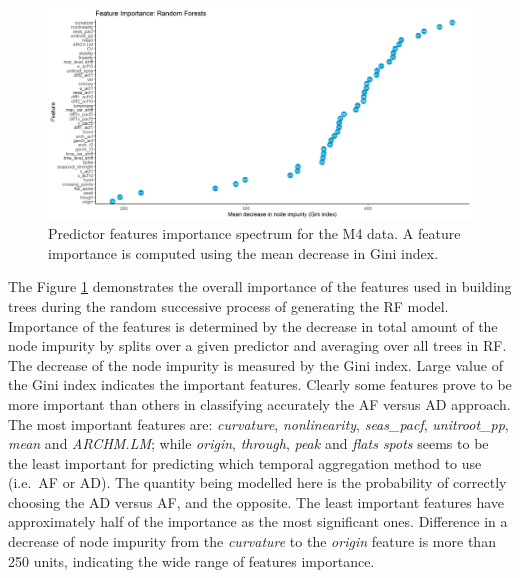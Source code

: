 \documentclass[preprint, 3p,
authoryear]{elsarticle} %
\begin{document}
\begin{figure}[H]

{\centering \includegraphics[width=0.95\linewidth]{img/300dpi/Fig_importance} 

}

\caption{Predictor features importance spectrum for the M4 data. A feature importance is computed using the mean decrease in Gini index.}\label{fig:RFpartial}
\end{figure}

The Figure \ref{fig:RFpartial} demonstrates the overall importance of
the features used in building trees during the random successive process
of generating the RF model. Importance of the features is determined by
the decrease in total amount of the node impurity by splits over a given
predictor and averaging over all trees in RF. The decrease of the node
impurity is measured by the Gini index. Large value of the Gini index
indicates the important features. Clearly some features prove to be more
important than others in classifying accurately the AF versus AD
approach. The most important features are: \emph{curvature},
\emph{nonlinearity}, \emph{seas\_pacf}, \emph{unitroot\_pp}, \emph{mean}
and \emph{ARCHM.LM}; while \emph{origin}, \emph{through}, \emph{peak}
and \emph{flats spots} seems to be the least important for predicting
which temporal aggregation method to use (i.e.~AF or AD). The quantity
being modelled here is the probability of correctly choosing the AD
versus AF, and the opposite. The least important features have
approximately half of the importance as the most significant ones.
Difference in a decrease of node impurity from the \emph{curvature} to
the \emph{origin} feature is more than 250 units, indicating the wide
range of features importance.
\end{document}
